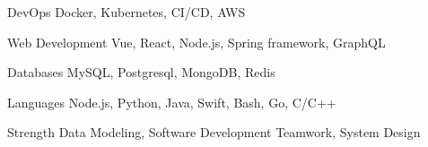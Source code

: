 
\begin{cvskills}

  \cvskill
    {DevOps} %
    {Docker, Kubernetes, CI/CD, AWS } %

    \cvskill
    {Web Development} %
    {Vue, React, Node.js, Spring framework, GraphQL} %

  \cvskill
    {Databases} %
    {MySQL, Postgresql, MongoDB, Redis} %

  \cvskill
    {Languages} %
    {Node.js, Python, Java, Swift, Bash, Go, C/C++} %

  \cvskill
    {Strength} %
    {Data Modeling, Software Development Teamwork, System Design} %

\end{cvskills}
